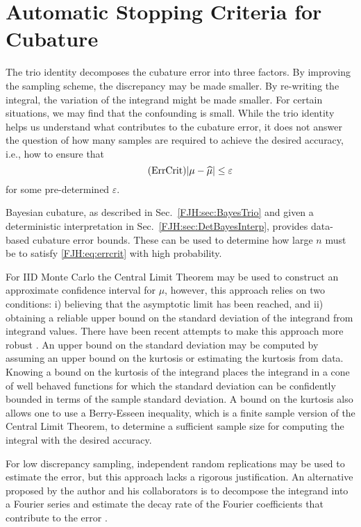 \documentclass[graybox,footinfo]{svmult}
\begin{document}
\begin{FJHLesson}
	\FJHLessonThirteen
\end{FJHLesson}

\section{Automatic Stopping Criteria for Cubature}
The trio identity decomposes the cubature error into three factors.  By improving the 
sampling scheme, the discrepancy may be made smaller.  By re-writing the integral, the 
variation of the integrand might be made smaller.  For certain situations, we may find that 
the confounding is small.  While the trio identity helps us understand what contributes to 
the cubature error, it does not answer the question of how many samples are 
required to achieve the desired accuracy, i.e., how to ensure that 
\begin{equation} \label{FJH:eq:errcrit} \tag{ErrCrit}
\lvert \mu - \hmu \rvert \le \varepsilon
\end{equation}
for some pre-determined $\varepsilon$.

Bayesian cubature, as described in Sec.\ \ref{FJH:sec:BayesTrio} and given a 
deterministic interpretation in Sec.\ \ref{FJH:sec:DetBayesInterp}, provides data-based 
cubature
error bounds.  These can be used to determine how large $n$ must be to satisfy 
\eqref{FJH:eq:errcrit} with high probability.

For IID Monte Carlo the Central Limit Theorem may be used to construct an approximate 
confidence interval for $\mu$, however, this approach relies on two conditions: i) believing 
that the asymptotic limit has been reached, and ii) obtaining a reliable upper bound on the 
standard deviation of the integrand from integrand values.  There have been recent 
attempts to make this approach more robust \cite{BayEtal14a,HicEtal14a,Jia16a}.  An 
upper bound on the standard deviation may be computed by assuming an upper bound 
on the kurtosis or estimating the kurtosis from data.  Knowing a bound on the kurtosis of the 
integrand places the integrand in a cone of well behaved functions for which the standard 
deviation can be confidently bounded in terms of the sample standard deviation.  A bound on 
the kurtosis also allows one to use a Berry-Esseen inequality, which is a finite sample version 
of  the Central Limit Theorem, to determine a sufficient sample size for computing the integral 
with the desired accuracy.

For low discrepancy sampling, independent random replications may be used to estimate 
the error, but this approach lacks a rigorous justification.  An alternative proposed by the 
author and his collaborators is to decompose the integrand into a Fourier series and 
estimate the decay rate of the Fourier coefficients that contribute to the error
\cite{HicJim16a,HicEtal17a,JimHic16a}.  
\end{document}
